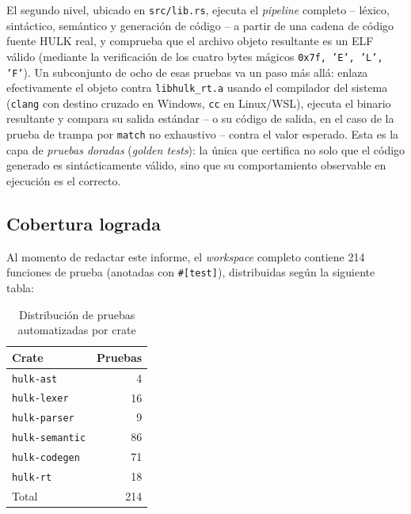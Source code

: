 \documentclass[12pt, a4paper]{article}
\begin{document}
El segundo nivel, ubicado en \texttt{src/lib.rs}, ejecuta el \textit{pipeline}
completo -- léxico, sintáctico, semántico y generación de código -- a partir
de una cadena de código fuente HULK real, y comprueba que el archivo objeto
resultante es un ELF válido (mediante la verificación de los cuatro bytes
mágicos \texttt{0x7f, 'E', 'L', 'F'}). Un subconjunto de ocho de esas pruebas
va un paso más allá: enlaza efectivamente el objeto contra
\texttt{libhulk\_rt.a} usando el compilador del sistema (\texttt{clang} con
destino cruzado en Windows, \texttt{cc} en Linux/WSL), ejecuta el binario
resultante y compara su salida estándar -- o su código de salida, en el caso
de la prueba de trampa por \texttt{match} no exhaustivo -- contra el valor
esperado. Esta es la capa de \textit{pruebas doradas} (\textit{golden tests}):
la única que certifica no solo que el código generado es sintácticamente
válido, sino que su comportamiento observable en ejecución es el correcto.

\subsection{Cobertura lograda}

Al momento de redactar este informe, el \textit{workspace} completo contiene
214 funciones de prueba (anotadas con \texttt{\#[test]}), distribuidas según
la siguiente tabla:

\begin{table}[h!]
\centering
\caption{Distribución de pruebas automatizadas por crate}
\label{tab:test-counts}
\begin{tabular}{@{}l r@{}}
\toprule
\textbf{Crate} & \textbf{Pruebas} \\
\midrule
\texttt{hulk-ast} & 4 \\
\texttt{hulk-lexer} & 16 \\
\texttt{hulk-parser} & 9 \\
\texttt{hulk-semantic} & 86 \\
\texttt{hulk-codegen} & 71 \\
\texttt{hulk-rt} & 18 \\
\midrule
Total & 214 \\
\bottomrule
\end{tabular}
\end{table}
\end{document}
